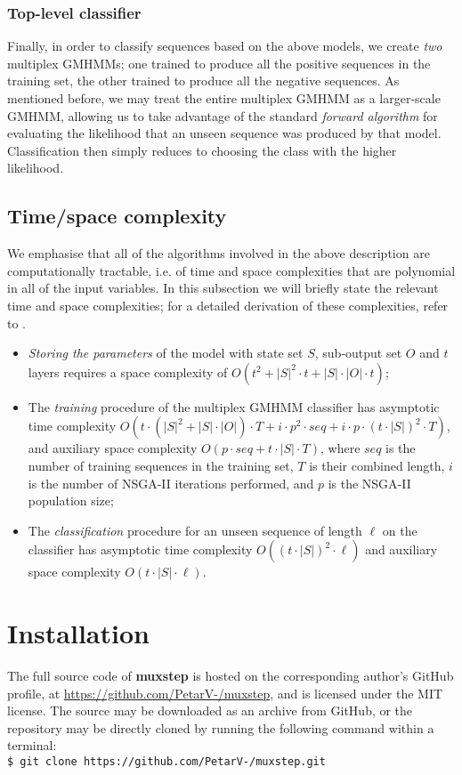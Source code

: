 \documentclass[12pt]{article}
\newcommand{\shellcmd}[1]{\\\indent\indent\texttt{\footnotesize\$ #1}}
\begin{document}
	\subsubsection{Top-level classifier}
	
	Finally, in order to classify sequences based on the above models, we create \emph{two} multiplex GMHMMs; one trained to produce all the positive sequences in the training set, the other trained to produce all the negative sequences. As mentioned before, we may treat the entire multiplex GMHMM as a larger-scale GMHMM, allowing us to take advantage of the standard \emph{forward algorithm} for evaluating the likelihood that an unseen sequence was produced by that model. Classification then simply reduces to choosing the class with the higher likelihood.
	
	\subsection{Time/space complexity}
	
	We emphasise that all of the algorithms involved in the above description are computationally tractable, i.e. of time and space complexities that are polynomial in all of the input variables. In this subsection we will briefly state the relevant time and space complexities; for a detailed derivation of these complexities, refer to \cite{Velickovic15}.
	\begin{itemize}
		\item \emph{Storing the parameters} of the model with state set $S$, sub-output set $O$ and $t$ layers requires a space complexity of $O(t^2 + |S|^2\cdot t + |S|\cdot |O|\cdot t)$;
		\item The \emph{training} procedure of the multiplex GMHMM classifier has asymptotic time complexity $O(t\cdot(|S|^2 + |S|\cdot |O|)\cdot T + i\cdot p^2\cdot seq + i\cdot p\cdot(t\cdot |S|)^2\cdot T)$, and auxiliary space complexity $O(p\cdot seq + t\cdot |S|\cdot T)$, where $seq$ is the number of training sequences in the training set, $T$ is their combined length, $i$ is the number of NSGA-II iterations performed, and $p$ is the NSGA-II population size;
		\item The \emph{classification} procedure for an unseen sequence of length $\ell$ on the classifier has asymptotic time complexity $O((t\cdot |S|)^2\cdot \ell)$ and auxiliary space complexity $O(t \cdot |S|\cdot \ell)$.
	\end{itemize}
	
	\section{Installation}\label{sec:install}
	The full source code of {\bf muxstep} is hosted on the corresponding author's GitHub profile, at \url{https://github.com/PetarV-/muxstep}, and is licensed under the MIT license. The source may be downloaded as an archive from GitHub, or the repository may be directly cloned by running the following command within a terminal:
	\shellcmd{git clone https://github.com/PetarV-/muxstep.git}
\end{document}
